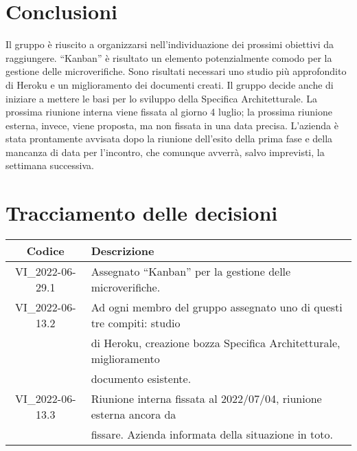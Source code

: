 \section{Conclusioni}
Il gruppo è riuscito a organizzarsi nell'individuazione dei prossimi obiettivi da raggiungere.
\newline
``Kanban'' è risultato un elemento potenzialmente comodo per la gestione delle microverifiche.
\newline
Sono risultati necessari uno studio più approfondito di Heroku e un miglioramento dei documenti creati. Il gruppo decide 
anche di iniziare a mettere le basi per lo sviluppo della Specifica Architetturale.
\newline
La prossima riunione interna viene fissata al giorno 4 luglio; la prossima riunione esterna, invece, viene proposta, ma non 
fissata in una data precisa. L'azienda è stata prontamente avvisata dopo la riunione dell'esito della prima fase e della 
mancanza di data per l'incontro, che comunque avverrà, salvo imprevisti, la settimana successiva.
\newpage

\section*{Tracciamento delle decisioni}
	\renewcommand{\arraystretch}{1.8} %
	\begin{tabular}{ |c|l| }
		\hline
		\textbf{Codice} & \textbf{Descrizione} \\
		\hline
		VI\_2022-06-29.1 & Assegnato ``Kanban'' per la gestione delle microverifiche.\\ %
		\hline
		VI\_2022-06-13.2 & Ad ogni membro del gruppo assegnato uno di questi tre compiti: studio \\ & di Heroku, 
		creazione bozza Specifica Architetturale, miglioramento \\ & documento esistente.\\ %
		\hline
		VI\_2022-06-13.3 & Riunione interna fissata al 2022/07/04, riunione esterna ancora da \\ & fissare. 
		Azienda informata della situazione in toto.\\ %
		\hline
	\end{tabular}